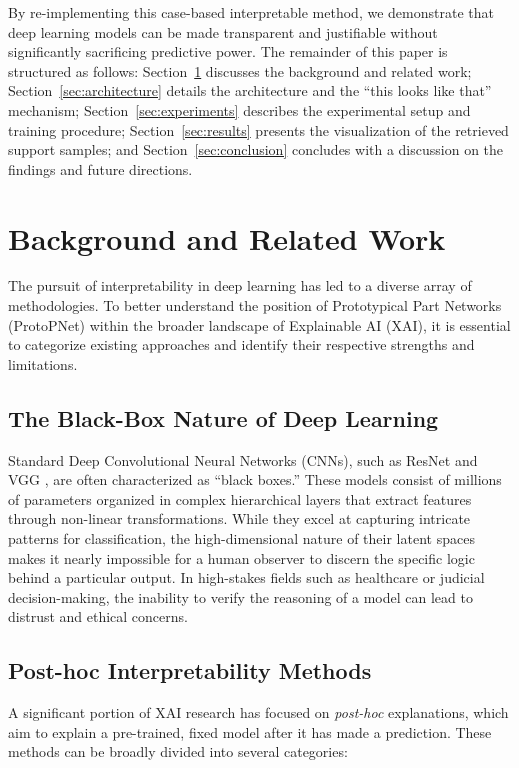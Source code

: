 \documentclass[conference]{IEEEtran}
\begin{document}
By re-implementing this case-based interpretable method, we demonstrate that deep learning models can be made transparent and justifiable without significantly sacrificing predictive power. The remainder of this paper is structured as follows: Section~\ref{sec:related_work} discusses the background and related work; Section~\ref{sec:architecture} details the architecture and the ``this looks like that'' mechanism; Section~\ref{sec:experiments} describes the experimental setup and training procedure; Section~\ref{sec:results} presents the visualization of the retrieved support samples; and Section~\ref{sec:conclusion} concludes with a discussion on the findings and future directions.

\section{Background and Related Work}
\label{sec:related_work}

The pursuit of interpretability in deep learning has led to a diverse array of methodologies. To better understand the position of Prototypical Part Networks (ProtoPNet) within the broader landscape of Explainable AI (XAI), it is essential to categorize existing approaches and identify their respective strengths and limitations.

\subsection{The Black-Box Nature of Deep Learning}
Standard Deep Convolutional Neural Networks (CNNs), such as ResNet \cite{b2} and VGG \cite{b3}, are often characterized as ``black boxes.'' These models consist of millions of parameters organized in complex hierarchical layers that extract features through non-linear transformations. While they excel at capturing intricate patterns for classification, the high-dimensional nature of their latent spaces makes it nearly impossible for a human observer to discern the specific logic behind a particular output. In high-stakes fields such as healthcare or judicial decision-making, the inability to verify the reasoning of a model can lead to distrust and ethical concerns.

\subsection{Post-hoc Interpretability Methods}
A significant portion of XAI research has focused on \textit{post-hoc} explanations, which aim to explain a pre-trained, fixed model after it has made a prediction. These methods can be broadly divided into several categories:
\end{document}
